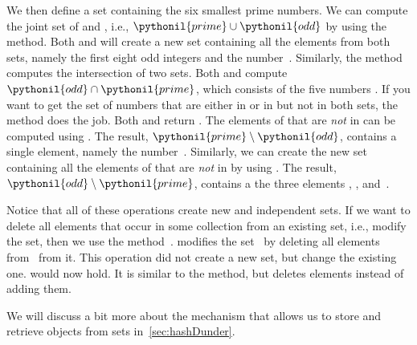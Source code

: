 \begin{sloppypar}%
We then define a set  containing the six smallest prime numbers.
We can compute the joint set of  and , i.e., $\pythonil{prime}\cup\pythonil{odd}$ by using the  method.
Both  and  will create a new set containing all the elements from both sets, namely the first eight odd integers and the number~.
Similarly, the  method computes the intersection of two sets.
Both  and  compute $\pythonil{odd}\cap\pythonil{prime}$, which consists of the five numbers .
If you want to get the set of numbers that are either in  or in  but not in both sets, the method  does the job.
Both  and  return .
The elements of  that are \emph{not} in  can be computed using .
The result, $\pythonil{prime}\setminus\pythonil{odd}$, contains a single element, namely the number~.
Similarly, we can create the new set  containing all the elements of  that are \emph{not} in  by using .
The result, $\pythonil{odd}\setminus\pythonil{prime}$, contains a the three elements , , and~.%
\end{sloppypar}%
%
Notice that all of these operations create new and independent sets.
If we want to delete all elements that occur in some collection from an existing set, i.e., modify the set, then we use the method~.
 modifies the set~ by deleting all elements from~ from it.
This operation did not create a new set, but change the existing one.
 would now hold.
It is similar to the  method, but deletes elements instead of adding them.

We will discuss a bit more about the mechanism that allows us to store and retrieve objects from sets in~\cref{sec:hashDunder}.%
%
\FloatBarrier%
\endhsection%
%
